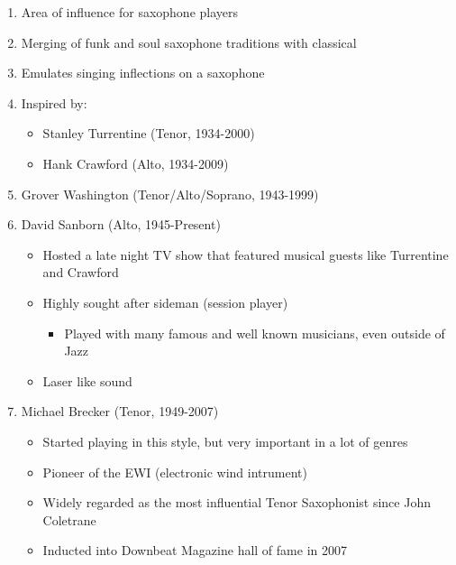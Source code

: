 \documentclass[]{article}
\providecommand{\tightlist}{%
  \setlength{\itemsep}{0pt}\setlength{\parskip}{0pt}}
\begin{document}
\begin{enumerate}
\def\labelenumi{\arabic{enumi}.}
\tightlist
\item
  Area of influence for saxophone players
\item
  Merging of funk and soul saxophone traditions with classical
\item
  Emulates singing inflections on a saxophone
\item
  Inspired by:

  \begin{itemize}
  \tightlist
  \item
    Stanley Turrentine (Tenor, 1934-2000)
  \item
    Hank Crawford (Alto, 1934-2009)
  \end{itemize}
\item
  Grover Washington (Tenor/Alto/Soprano, 1943-1999)
\item
  David Sanborn (Alto, 1945-Present)

  \begin{itemize}
  \tightlist
  \item
    Hosted a late night TV show that featured musical guests like
    Turrentine and Crawford
  \item
    Highly sought after sideman (session player)

    \begin{itemize}
    \tightlist
    \item
      Played with many famous and well known musicians, even outside of
      Jazz
    \end{itemize}
  \item
    Laser like sound
  \end{itemize}
\item
  Michael Brecker (Tenor, 1949-2007)

  \begin{itemize}
  \tightlist
  \item
    Started playing in this style, but very important in a lot of genres
  \item
    Pioneer of the EWI (electronic wind intrument)
  \item
    Widely regarded as the most influential Tenor Saxophonist since John
    Coletrane
  \item
    Inducted into Downbeat Magazine hall of fame in 2007
  \end{itemize}
\end{enumerate}
\end{document}
